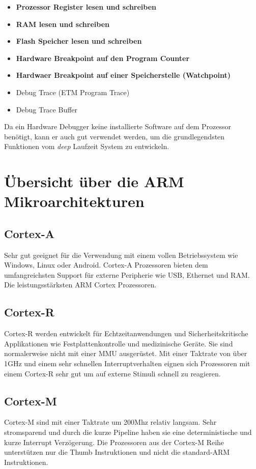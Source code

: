 \begin{itemize}
	\item \textbf{Prozessor Register lesen und schreiben}
	\item \textbf{RAM lesen und schreiben}
	\item \textbf{Flash Speicher lesen und schreiben} 
	\item \textbf{Hardware Breakpoint auf den Program Counter} 
	\item \textbf{Hardwaer Breakpoint auf einer Speicherstelle (Watchpoint)} 
	\item Debug Trace (ETM Program Trace) 
	\item Debug Trace Buffer
\end{itemize}

Da ein Hardware Debugger keine installierte Software auf dem Prozessor benötigt, kann er auch gut verwendet werden, um die grundlegendsten Funktionen vom \textit{deep} Laufzeit System zu entwickeln.




\section{Übersicht über die ARM Mikroarchitekturen}
\subsection{Cortex-A}
Sehr gut geeignet für die Verwendung mit einem vollen Betriebssystem wie Windows, Linux oder Android.
Cortex-A Prozessoren bieten dem umfangreichsten Support für externe Peripherie wie USB, Ethernet und RAM.
Die leistungsstärksten ARM Cortex Prozessoren.

\subsection{Cortex-R}
Cortex-R werden entwickelt für Echtzeitanwendungen und Sicherheitskritische Applikationen wie Festplattenkontrolle und medizinische Geräte.
Sie sind normalerweise nicht mit einer MMU ausgerüstet.
Mit einer Taktrate von über 1GHz und einem sehr schnellen Interruptverhalten eignen sich Prozessoren mit einem Cortex-R sehr gut um auf externe Stimuli schnell zu reagieren.

\subsection{Cortex-M}
Cortex-M sind mit einer Taktrate um 200Mhz relativ langsam.
Sehr stromsparend und durch die kurze Pipeline haben sie eine deterministische und kurze Interrupt Verzögerung.
Die Prozessoren aus der Cortex-M Reihe unterstützen nur die Thumb Instruktionen und nicht die standard-ARM Instruktionen.


